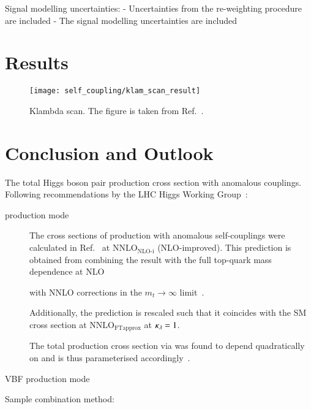 Signal modelling uncertainties:
- Uncertainties from the re-weighting procedure are included
- The signal modelling uncertainties are included


\section{Results}%
\label{sec:reinterpretation_results}


\begin{figure}[htbp]
  \centering

  \texttt{[image: self\_coupling/klam\_scan\_result]}

  \caption{Klambda scan. The figure is taken from
    Ref.~\cite{ATLAS-CONF-2021-052}.}%
  \label{fig:klambda_scan}
\end{figure}


\section{Conclusion and Outlook}%
\label{sec:reinterpretation_conclusion}


The total Higgs boson pair production cross section with anomalous
couplings. Following recommendations by the LHC Higgs Working
Group~\cite{LHCHWGHH}:
\begin{description}

\item[\ggF production mode] The cross sections of \HH production with
  anomalous self-couplings were calculated in
  Ref.~\cite{Amoroso:2020lgh} at $\text{NNLO}_{\text{NLO-i}}$
  (NLO-improved). This prediction is obtained from combining the
  result with the full top-quark mass dependence at
  NLO~\cite{Buchalla:2018yce}


  with NNLO corrections in the $m_{t} \to \infty$
  limit~\cite{deFlorian:2017qfk}.

  Additionally, the prediction is rescaled such that it coincides with
  the SM \HH cross section at $\text{NNLO}_{\text{FTapprox}}$ at
  $\kappa_{\lambda} = 1$.

  The total \HH production cross section via \ggF was found to depend
  quadratically on \klambda and is thus parameterised
  accordingly~\cite{LHCHWGHH}.

\item[VBF production mode]

\end{description}



Sample combination method:~\cite{ATL-PHYS-PUB-2019-007}




